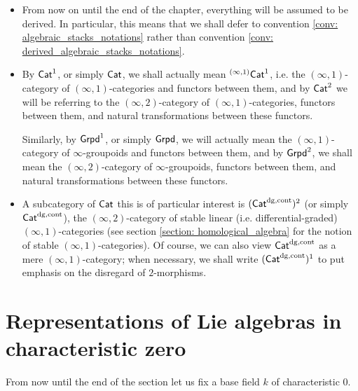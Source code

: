     \begin{convention} \label{conv: formal_geometry_everything_is_derived}
        \noindent
        \begin{itemize}
            \item From now on until the end of the chapter, everything will be assumed to be derived. In particular, this means that we shall defer to convention \ref{conv: algebraic_stacks_notations} rather than convention \ref{conv: derived_algebraic_stacks_notations}.
            \item By $\mathsf{Cat}^1$, or simply $\mathsf{Cat}$, we shall actually mean ${}^{(\infty, 1)}\mathsf{Cat}^1$, i.e. the $(\infty, 1)$-category of $(\infty, 1)$-categories and functors between them, and by $\mathsf{Cat}^2$ we will be referring to the $(\infty, 2)$-category of $(\infty, 1)$-categories, functors between them, and natural transformations between these functors. 
            
            Similarly, by $\mathsf{Grpd}^1$, or simply $\mathsf{Grpd}$, we will actually mean the $(\infty, 1)$-category of $\infty$-groupoids and functors between them, and by $\mathsf{Grpd}^2$, we shall mean the $(\infty, 2)$-category of $\infty$-groupoids, functors between them, and natural transformations between these functors.
            \item A subcategory of $\mathsf{Cat}$ this is of particular interest is $(\mathsf{Cat}^{\mathrm{dg}, \mathrm{cont}})^2$ (or simply $\mathsf{Cat}^{\mathrm{dg}, \mathrm{cont}}$), the $(\infty, 2)$-category of stable linear (i.e. differential-graded) $(\infty, 1)$-categories (see section \ref{section: homological_algebra} for the notion of stable $(\infty, 1)$-categories). Of course, we can also view $\mathsf{Cat}^{\mathrm{dg}, \mathrm{cont}}$ as a mere $(\infty, 1)$-category; when necessary, we shall write $(\mathsf{Cat}^{\mathrm{dg}, \mathrm{cont}})^1$ to put emphasis on the disregard of $2$-morphisms.
        \end{itemize} 
    \end{convention}
    
    \section{Representations of Lie algebras in characteristic zero}
        \begin{convention}
            From now until the end of the section let us fix a base field $k$ of characteristic $0$.
        \end{convention}
    

